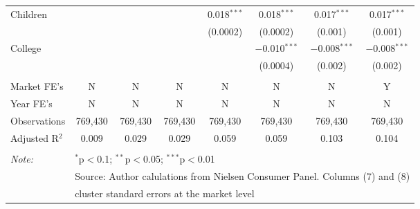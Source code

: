 \begin{table}[!htbp]
{\begin{tabular}{@{\extracolsep{5pt}}lccccccc}
  Children &  &  &  & 0.018$^{***}$ & 0.018$^{***}$ & 0.017$^{***}$ & 0.017$^{***}$ \\
  &  &  &  & (0.0002) & (0.0002) & (0.001) & (0.001) \\
  College &  &  &  &  & $-$0.010$^{***}$ & $-$0.008$^{***}$ & $-$0.008$^{***}$ \\
  &  &  &  &  & (0.0004) & (0.002) & (0.002) \\
 \hline \\[-1.8ex]
Market FE's & N & N & N & N & N & N & Y \\
Year FE's & N & N & N & N & N & N & N \\
Observations & 769,430 & 769,430 & 769,430 & 769,430 & 769,430 & 769,430 & 769,430 \\
Adjusted R$^{2}$ & 0.009 & 0.029 & 0.029 & 0.059 & 0.059 & 0.103 & 0.104 \\
\hline
\hline \\[-1.8ex]
\textit{Note:}  & \multicolumn{7}{l}{$^{*}$p$<$0.1; $^{**}$p$<$0.05; $^{***}$p$<$0.01} \\
 & \multicolumn{7}{l}{Source: Author calulations from Nielsen Consumer Panel. Columns (7) and (8) } \\
 & \multicolumn{7}{l}{cluster standard errors at the market level} \\
\end{tabular}
}
\end{table}
